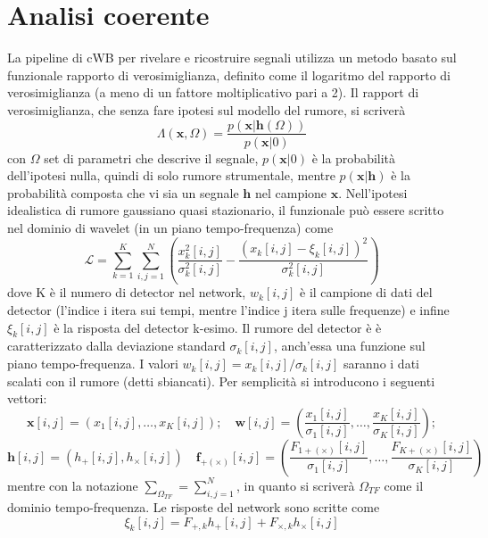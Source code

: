 \section{Analisi coerente}
\label{section:coherent_analysis}
La pipeline di cWB per rivelare e ricostruire segnali utilizza un metodo basato sul funzionale rapporto di verosimiglianza, definito come il logaritmo del rapporto di verosimiglianza (a meno di un fattore moltiplicativo pari a 2). Il rapport di verosimiglianza, che senza fare ipotesi sul modello del rumore, si scriverà
\begin{equation}
	\mathcal{\Lambda}(\mathbf{x},\Omega) = \frac{p(\mathbf{x}|\mathbf{h}(\Omega))}{p(\mathbf{x}|0)}
\end{equation}
con $\Omega$ set di parametri che descrive il segnale, $p(\mathbf{x}|0)$ è la probabilità dell'ipotesi nulla, quindi di solo rumore strumentale, mentre $p(\mathbf{x}|\mathbf{h})$ è la probabilità composta che vi sia un segnale $\mathbf{h}$ nel campione $\mathbf{x}$\cite{Klimenko_2016}.
Nell'ipotesi idealistica di rumore gaussiano quasi stazionario, il funzionale può essere scritto nel dominio di wavelet (in un piano tempo-frequenza) come
\begin{equation}
	\mathcal{L} = \sum_{k=1}^{K}\sum_{i,j=1}^{N}\left(\frac{x_k^2[i,j]}{\sigma_k^2[i,j]} - \frac{(x_k[i,j]-\xi_k[i,j])^2}{\sigma_k^2[i,j]}  \right)
	\label{eqn:Likelihood}
\end{equation}
dove K è il numero di detector nel network, $w_k[i,j]$ è il campione di dati del detector (l'indice i itera sui tempi, mentre l'indice j itera sulle frequenze) e infine $\xi_k[i,j]$ è la risposta del detector k-esimo\cite{Klimenko_2008}.
Il rumore del detector è è caratterizzato dalla deviazione standard $\sigma_k[i,j]$,  anch'essa una funzione sul piano tempo-frequenza. I valori $w_k[i,j] = x_k[i,j]/\sigma_k[i,j]$ saranno i dati scalati con il rumore (detti sbiancati)\cite{Klimenko_2016}.
Per semplicità si introducono i seguenti vettori:
\[
\mathbf{x}[i,j] = \left(x_1[i,j],\dots, x_K[i,j] \right) ;
\quad
\mathbf{w}[i,j] = \left(\frac{x_1[i,j]}{\sigma_1[i,j]},\dots, \frac{x_K[i,j]}{\sigma_K[i,j]} \right) ;
\]
\[
\mathbf{h}[i,j] = (h_+[i,j], h_\times[i,j])
\quad
\mathbf{f}_{+(\times)}[i,j] = \left(\frac{F_{1+(\times)}[i,j]}{\sigma_1[i,j]},\dots, \frac{F_{K+(\times)}[i,j]}{\sigma_K[i,j]} \right) 
\]
mentre con la notazione $\sum_{\Omega_{TF}} = \sum_{i,j=1}^N$, in quanto si scriverà $\Omega_{TF}$ come il dominio tempo-frequenza. 
Le risposte del network sono scritte come
\begin{equation}
	\xi_k[i,j] = F_{+,k}h_+[i,j] + F_{\times,k}h_\times[i,j]
	\label{eqn:detector_response}
\end{equation}
